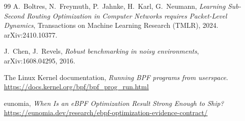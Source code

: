 \documentclass[11pt,a4paper,oneside]{report}
\begin{document}
\begin{thebibliography}{99}
A.~Boltres, N.~Freymuth, P.~Jahnke, H.~Karl, G.~Neumann,
\emph{Learning Sub-Second Routing Optimization in Computer Networks
requires Packet-Level Dynamics}, Transactions on Machine Learning
Research (TMLR), 2024. arXiv:2410.10377.

J.~Chen, J.~Revels,
\emph{Robust benchmarking in noisy environments}, arXiv:1608.04295,
2016.

The Linux Kernel documentation,
\emph{Running BPF programs from userspace}.
\url{https://docs.kernel.org/bpf/bpf_prog_run.html}

eunomia,
\emph{When Is an eBPF Optimization Result Strong Enough to Ship?}
\url{https://eunomia.dev/research/ebpf-optimization-evidence-contract/}

\end{thebibliography}
\end{document}
